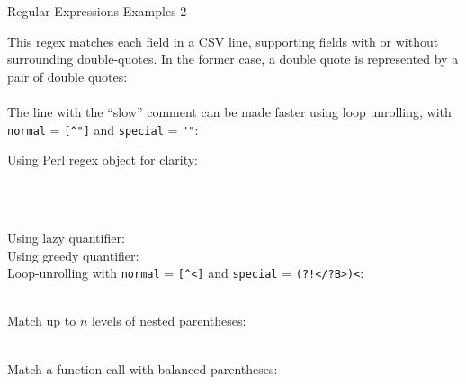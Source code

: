 \documentclass[11pt, a4paper, landscape]{scrartcl}
\newcommand{\regex}[1]{\texttt{#1}}
\newcommand{\cregex}[1]{\colorbox{gray!30}{\regex{#1}}}
\newcommand{\reshortexample}[1]{\cregex{}}
\newcommand{\relongexample}[1]{\regex{}}
\begin{document}
\begin{cheatsheet}{Regular Expressions Examples 2}

\begin{col1}


This regex matches each field in a CSV line, supporting fields with or without
surrounding double-quotes. In the former case, a double quote is represented by
a pair of double quotes:\\
\relongexample{./parse_csv.tex}\\
The line with the ``slow'' comment can be made faster using loop unrolling,
with \regex{normal} = \cregex{[\^{}"]} and \regex{special} = \cregex{""}:
\reshortexample{./parse_csv_lu.tex}\\


Using Perl regex object for clarity:\\
\relongexample{./ip.tex}\\


\relongexample{./email_addr.tex}

\end{col1}

\begin{col2}


\relongexample{./url.tex}\\


Using lazy quantifier:
\reshortexample{./matchclosetag_lazy.tex}\\
Using greedy quantifier:
\reshortexample{./matchclosetag_greedy.tex}\\
Loop-unrolling with
\regex{normal} = \cregex{[\^{}<]} and
\regex{special} = \cregex{(?!</?B>)<}:\\
\relongexample{./matchclosetag_lu.tex}\\

\end{col2}

\begin{col3}


Match up to $n$ levels of nested parentheses:\\
\relongexample{./balanced_paren_static.tex}\\


Match a function call with balanced parentheses:\\
\relongexample{./balanced_paren_dynamic.tex}\\

\end{col3}

\end{cheatsheet}
\end{document}
